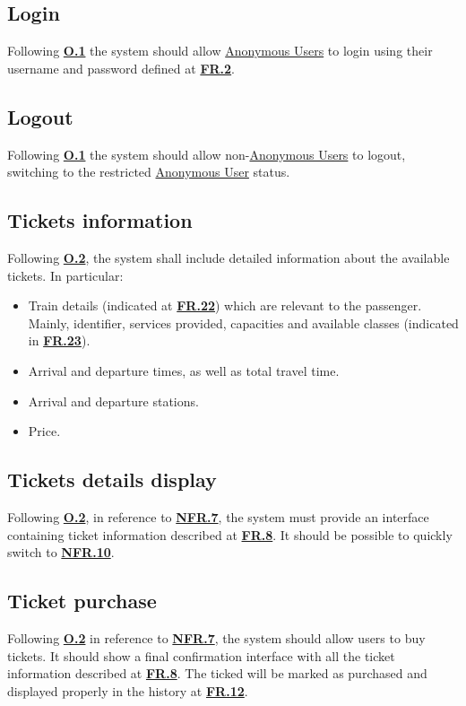 \documentclass[12pt]{article}
\renewcommand\bf[1]{\textbf{#1}}
\newcommand\un[1]{\underline{#1}}
\newcommand\hyl[1]{\hyperref[#1]{\bf{#1}}}
\begin{document}
\subsection{Login} \label{FR.6}
Following \hyl{O.1} the system should allow \un{Anonymous Users} to login using their username and password defined at \hyl{FR.2}.

\subsection{Logout} \label{FR.7}
Following \hyl{O.1} the system should allow non-\un{Anonymous Users} to logout, switching to the restricted \un{Anonymous User} status.

\subsection{Tickets information} \label{FR.8}
Following \hyl{O.2}, the system shall include detailed information about the available tickets. In particular:
\begin{itemize}
	\item Train details (indicated at \hyl{FR.22}) which are relevant to the passenger.
	Mainly, identifier, services provided, capacities and available classes (indicated in \hyl{FR.23}).
	\item Arrival and departure times, as well as total travel time.
	\item Arrival and departure stations.
	\item Price.
\end{itemize}

\subsection{Tickets details display} \label{FR.9}
Following \hyl{O.2}, in reference to \hyl{NFR.7}, the system must provide an interface containing ticket information described at \hyl{FR.8}. 
It should be possible to quickly switch to \hyl{NFR.10}.

\subsection{Ticket purchase} \label{FR.10}
Following \hyl{O.2} in reference to \hyl{NFR.7}, the system should allow users to buy tickets. It should show a final confirmation interface with all the ticket information described at \hyl{FR.8}. 
The ticked will be marked as purchased and displayed properly in the history at \hyl{FR.12}.
\end{document}
